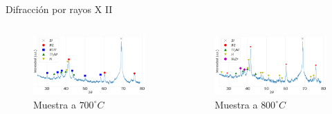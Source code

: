 \documentclass[11pt]{beamer}
\begin{document}
			\begin{frame}{Difracción por rayos X II}
			\begin{columns}
				\begin{column}{.49\textwidth}
					\begin{figure}
						\includegraphics[scale=0.1]{img/RX/NiRich_700.png}
						\caption*{Muestra a $700 ^\circ C$}
					\end{figure}
				\end{column}
				\begin{column}{.49\textwidth}
					\begin{figure}
						\includegraphics[scale=0.1]{img/RX/NiRich_800.png}
						\caption*{Muestra a $800 ^\circ C$}
					\end{figure}
				\end{column}
			\end{columns}		
			\end{frame}
	
\end{document}
